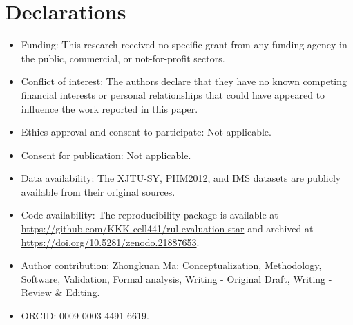 \documentclass[pdflatex,sn-mathphys-num]{sn-jnl}
\begin{document}
\section*{Declarations}
\begin{itemize}
\item Funding: This research received no specific grant from any funding agency in the public, commercial, or not-for-profit sectors.
\item Conflict of interest: The authors declare that they have no known competing financial interests or personal relationships that could have appeared to influence the work reported in this paper.
\item Ethics approval and consent to participate: Not applicable.
\item Consent for publication: Not applicable.
\item Data availability: The XJTU-SY, PHM2012, and IMS datasets are publicly available from their original sources.
\item Code availability: The reproducibility package is available at \url{https://github.com/KKK-cell441/rul-evaluation-star} and archived at \url{https://doi.org/10.5281/zenodo.21887653}.
\item Author contribution: Zhongkuan Ma: Conceptualization, Methodology, Software, Validation, Formal analysis, Writing - Original Draft, Writing - Review \& Editing.
\item ORCID: 0009-0003-4491-6619.
\end{itemize}
\end{document}

